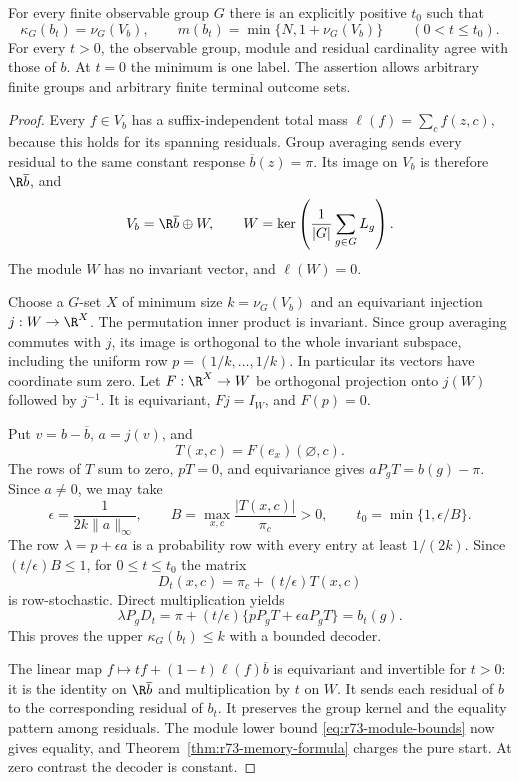 \begin{theorem}
\label{thm:r74-low-contrast}
For every finite observable group $G$ there is an explicitly positive $t_0$
such that
\begin{equation}\label{eq:r74-small-contrast}
 \kappa_G(b_t)=\nu_G(V_b),\qquad
 m(b_t)=\min\{N,1+\nu_G(V_b)\}\qquad(0<t\le t_0).
\end{equation}
For every $t>0$, the observable group, module and residual cardinality agree
with those of $b$. At $t=0$ the minimum is one label. The assertion allows
arbitrary finite groups and arbitrary finite terminal outcome sets.
\end{theorem}
\begin{proof}
Every $f\in V_b$ has a suffix-independent total mass
$\ell(f)=\sum_c f(z,c)$, because this holds for its spanning residuals.
Group averaging sends every residual to the same constant response
$\overline b(z)=\pi$. Its image on $V_b$ is therefore $\R\overline b$, and
\[
 V_b=\R\overline b\oplus W,
 \qquad W=\ker\left(\frac1{|G|}\sum_{g\in G}L_g\right).
\]
The module $W$ has no invariant vector, and $\ell(W)=0$.

Choose a $G$-set $X$ of minimum size $k=\nu_G(V_b)$ and an equivariant
injection $j:W\to\R^X$. The permutation inner product is invariant.
Since group averaging commutes with $j$, its image is orthogonal to the
whole invariant subspace, including the uniform row
$p=(1/k,\ldots,1/k)$. In particular its vectors have coordinate sum zero.
Let $F:\R^X\to W$ be orthogonal projection onto $j(W)$ followed by
$j^{-1}$. It is equivariant, $Fj=I_W$, and $F(p)=0$.

Put $v=b-\overline b$, $a=j(v)$, and
\[
 T(x,c)=F(e_x)(\varnothing,c).
\]
The rows of $T$ sum to zero, $pT=0$, and equivariance gives
$aP_gT=b(g)-\pi$. Since $a\ne0$, we may take
\[
 \epsilon=\frac{1}{2k\|a\|_\infty},\qquad
 B=\max_{x,c}\frac{|T(x,c)|}{\pi_c}>0,
 \qquad t_0=\min\{1,\epsilon/B\}.
\]
The row $\lambda=p+\epsilon a$ is a probability row with every entry at
least $1/(2k)$. Since $(t/\epsilon)B\le1$, for $0\le t\le t_0$ the matrix
\[
 D_t(x,c)=\pi_c+(t/\epsilon)T(x,c)
\]
is row-stochastic. Direct multiplication yields
\[
 \lambda P_gD_t
 =\pi+(t/\epsilon)\{pP_gT+\epsilon aP_gT\}
 =b_t(g).
\]
This proves the upper $\kappa_G(b_t)\le k$ with a bounded decoder.

The linear map
$f\mapsto tf+(1-t)\ell(f)\overline b$ is equivariant and invertible for
$t>0$: it is the identity on $\R\overline b$ and multiplication by $t$ on
$W$. It sends each residual of $b$ to the corresponding residual of $b_t$.
It preserves the group kernel and the equality pattern among residuals.
The module lower bound \eqref{eq:r73-module-bounds} now gives equality,
and Theorem~\ref{thm:r73-memory-formula} charges the pure start. At zero
contrast the decoder is constant.
\end{proof}

